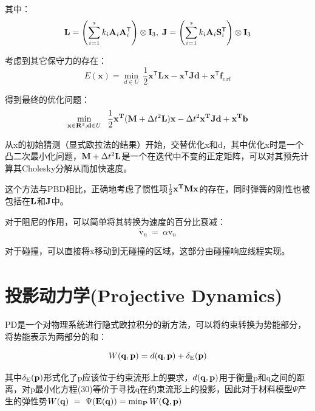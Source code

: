 \documentclass{CLGPY}
\begin{document}
\begin{multicols}{2}
		其中：
		\begin{equation}
			{\bf L}=\left(\sum_{i=1}^{s}k_{i}{\bf A}_{i}{\bf  A}_{i}^{\mathsf{T}}\right)\otimes{\bf I}_{3},\;{\bf J}=\left(\sum_{i=1}^{s}k_{i}{\bf A}_{i}{\bf S}_{i}^{\mathsf{T}}\right)\otimes{\bf I}_{3}
		\end{equation}

		考虑到其它保守力的存在：
       \begin{equation}
			E(\mathbf{x})=\operatorname*{min}_{d\in U}~{\frac{1}{2}}\mathbf{x}^{\mathsf{T}}\mathbf{L}\mathbf{x}-\mathbf{x}^{\mathsf{T}}\mathbf{J}\mathbf{d}+\mathbf{x}^{\mathsf{T}}\mathbf{f}_{e x t}
		\end{equation}

		得到最终的优化问题：
       \begin{equation}
			\operatorname*{min}_{{{\bf x}\in{\bf R}^{3},{\bf d}\in U}}\;\;\frac{1}{2}{\bf x}^{\bf T}({\bf M}+\Delta t^2{\bf L}){\bf x}-\Delta t^2{\bf x}^{\bf T}{\bf J}{\bf d}+{\bf x}^{\bf T}{\bf b}
		\end{equation}

		从x的初始猜测（显式欧拉法的结果）开始，交替优化x和d，其中优化x时是一个凸二次最小化问题，${\bf M}+\Delta t^2{\bf L}$是一个在迭代中不变的正定矩阵，可以对其预先计算其Cholesky分解从而加快速度。

		这个方法与PBD相比，正确地考虑了惯性项$\frac{1}{2}{\bf x}^{\bf T}{\bf M}{\bf x}$的存在，同时弹簧的刚性也被包括在${\bf L}$和${\bf J}$中。

		对于阻尼的作用，可以简单将其转换为速度的百分比衰减：
       \begin{equation}
			\tilde{\mathrm{v}}_{n}\ =\ \alpha \mathrm{v}_{n}
		\end{equation}

		对于碰撞，可以直接将x移动到无碰撞的区域，这部分由碰撞响应线程实现。


		\section{投影动力学(Projective Dynamics)\textsuperscript{\cite{2}}}
		PD是一个对物理系统进行隐式欧拉积分的新方法，可以将约束转换为势能部分，将势能表示为两部分的和：

       \begin{equation}
			W({\bf q},{\bf p})=d({\bf q},{\bf p})+\delta_{\mathrm{E}}({\bf p})
		\end{equation}

		其中$\delta_{\mathrm{E}}({\bf p})$形式化了p应该位于约束流形上的要求，$d({\bf q},{\bf p})$用于衡量p和q之间的距离，对p最小化方程(30)等价于寻找q在约束流形上的投影，因此对于材料模型$\Psi$产生的弹性势$W({\bf{q}})\,\,=\,\,\Psi({\bf{E}}({\bf{q}}))=\operatorname*{min}_{\mathbf{P}}W(\mathbf{Q},\mathbf{p})$


\end{multicols}
\end{document}
